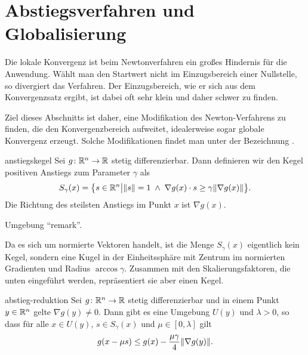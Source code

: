 \section{Abstiegsverfahren und Globalisierung}

\begin{intro}
  Die lokale Konvergenz ist beim Newtonverfahren ein großes Hindernis
  für die Anwendung. Wählt man den Startwert nicht im Einzugsbereich
  einer Nullstelle, so divergiert das Verfahren. Der Einzugsbereich,
  wie er sich aus dem Konvergenzsatz ergibt, ist dabei oft sehr klein
  und daher schwer zu finden.

  Ziel dieses Abschnitts ist daher, eine Modifikation des
  Newton-Verfahrens zu finden, die den Konvergenzbereich aufweitet,
  idealerweise sogar globale Konvergenz erzeugt. Solche Modifikationen
  findet man unter der Bezeichnung .
\end{intro}

\begin{Definition}{anstiegskegel}
  Sei $g\colon \mathbb R^n\to \mathbb R$ stetig differenzierbar. Dann definieren wir
  den Kegel positiven Anstiegs zum Parameter $\gamma$ als
  \begin{gather}
    S_\gamma(x) = \bigl\{ s\in\mathbb R^n \big|
    \lVert s\rVert = 1 \;\wedge \;
    \nabla g(x)\cdot s \ge \gamma\lVert\nabla g(x)\rVert
    \bigr\}.
  \end{gather}
  Die Richtung des steilsten Anstiegs im Punkt $x$ ist $\nabla g(x)$.
\end{Definition}

\begin{todo}
  Umgebung ``remark''.
\end{todo}
Da es sich um normierte Vektoren handelt, ist die Menge $S_\gamma(x)$
eigentlich kein Kegel, sondern eine Kugel in der Einheitssphäre mit
Zentrum im normierten Gradienten und Radius $\arccos \gamma$. Zusammen
mit den Skalierungsfaktoren, die unten eingeführt werden,
repräsentiert sie aber einen Kegel.


\begin{Lemma}{abstieg-reduktion}
  Sei $g\colon\mathbb R^n\to\mathbb R$ stetig differenzierbar und in einem Punkt
  $y\in\mathbb R^n$ gelte $\nabla g(y) \neq 0$. Dann gibt es eine Umgebung
  $U(y)$ und $\lambda>0$, so dass für alle $x\in U(y)$,
  $s\in S_\gamma(x)$ und $\mu\in [0,\lambda]$ gilt
  \begin{gather}
    g(x-\mu s) \le g(x) - \frac{\mu\gamma}4 \lVert\nabla g(y)\rVert.
  \end{gather}
\end{Lemma}

